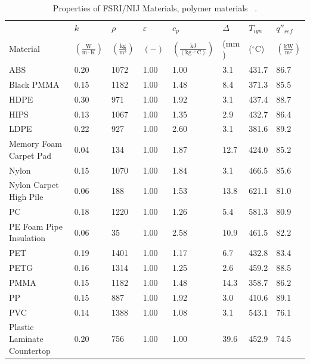\begin{table}[!h]
\caption[Properties of FSRI/NIJ Materials, polymer materials]{Properties of FSRI/NIJ Materials, polymer materials ~\cite{McKinnon:FSRI2023_Data}.}
\centering
\begin{tabular}{|p{5.5cm}|p{1.0cm}|p{1.0cm}|p{0.8cm}|p{1.4cm}|p{1.0cm}|p{1.0cm}|p{1.2cm}|}
\hline
                                               & $k$    & $\rho$      & $\varepsilon$   & $c_{p}$ & $\Delta$    & $T_{ign}$ & $q''_{ref}$ \\
Material                                       & $\mathrm{\left(\frac{W}{m\cdot K}\right)}$ & $\mathrm{\left(\frac{kg}{m^{3}}\right)}$ & $\mathrm{( - )}$ & $\mathrm{\left(\frac{kJ}{(kg\cdot ^{\circ}C)}\right)}$ &  ($\mathrm{mm}$)   & ($\mathrm{^{\circ}C}$) & $\mathrm{\left(\frac{kW}{m^{2}}\right)}$ \\ \hline
\hline
ABS & 0.20 & 1072 & 1.00 & 1.00 & 3.1 & 431.7 & 86.7 \\ \hline
Black PMMA & 0.15 & 1182 & 1.00 & 1.48 & 8.4 & 371.3 & 85.5 \\ \hline
HDPE & 0.30 & 971 & 1.00 & 1.92 & 3.1 & 437.4 & 88.7 \\ \hline
HIPS & 0.13 & 1067 & 1.00 & 1.35 & 2.9 & 432.7 & 86.4 \\ \hline
LDPE & 0.22 & 927 & 1.00 & 2.60 & 3.1 & 381.6 & 89.2 \\ \hline
Memory Foam Carpet Pad & 0.04 & 134 & 1.00 & 1.87 & 12.7 & 424.0 & 85.2 \\ \hline
Nylon & 0.15 & 1070 & 1.00 & 1.84 & 3.1 & 466.5 & 85.6 \\ \hline
Nylon Carpet High Pile & 0.06 & 188 & 1.00 & 1.53 & 13.8 & 621.1 & 81.0 \\ \hline
PC & 0.18 & 1220 & 1.00 & 1.26 & 5.4 & 581.3 & 80.9 \\ \hline
PE Foam Pipe Insulation & 0.06 & 35 & 1.00 & 2.58 & 10.9 & 461.5 & 82.2 \\ \hline
PET & 0.19 & 1401 & 1.00 & 1.17 & 6.7 & 432.8 & 83.4 \\ \hline
PETG & 0.16 & 1314 & 1.00 & 1.25 & 2.6 & 459.2 & 88.5 \\ \hline
PMMA & 0.15 & 1182 & 1.00 & 1.48 & 14.3 & 358.7 & 86.2 \\ \hline
PP & 0.15 & 887 & 1.00 & 1.92 & 3.0 & 410.6 & 89.1 \\ \hline
PVC & 0.14 & 1388 & 1.00 & 1.08 & 3.1 & 543.1 & 76.1 \\ \hline
Plastic Laminate Countertop & 0.20 & 756 & 1.00 & 1.00 & 39.6 & 452.9 & 74.5 \\ \hline

\end{tabular}
\end{table}
